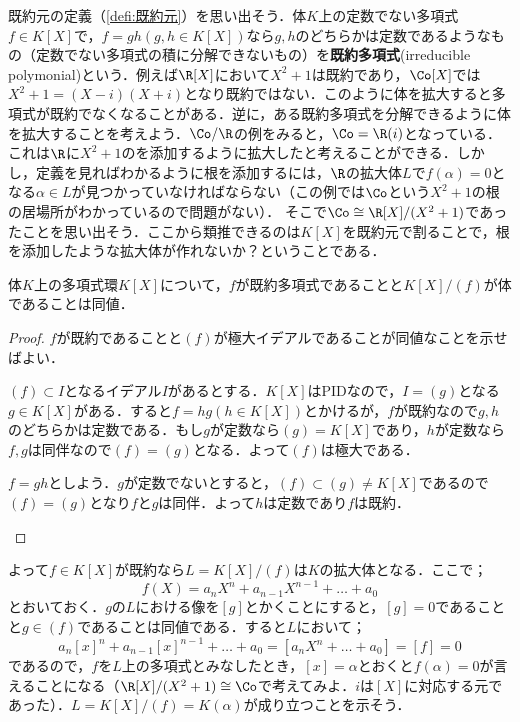 既約元の定義（\ref{defi:既約元}）を思い出そう．体$K$上の定数でない多項式$f\in K[X]$で，$f=gh (g,h\in K[X])$なら$g,h$のどちらかは定数であるようなもの（定数でない多項式の積に分解できないもの）を\textbf{既約多項式}(irreducible polymonial)という．例えば$\R[X]$において$X^2+1$は既約であり，$\Co[X]$では$X^2+1=(X-i)(X+i)$となり既約ではない．このように体を拡大すると多項式が既約でなくなることがある．逆に，ある既約多項式を分解できるように体を拡大することを考えよう．$\Co/\R$の例をみると，$\Co=\R(i)$となっている．これは$\R$に$X^2+1$のを添加するように拡大したと考えることができる．しかし，定義を見ればわかるように根を添加するには，$\R$の拡大体$L$で$f(\alpha)=0$となる$\alpha\in L$が見つかっていなければならない（この例では$\Co$という$X^2+1$の根の居場所がわかっているので問題がない）． そこで$\Co\cong\R[X]/(X^2+1)$であったことを思い出そう．ここから類推できるのは$K[X]$を既約元で割ることで，根を添加したような拡大体が作れないか？ということである．

\begin{prop}
	体$K$上の多項式環$K[X]$について，$f$が既約多項式であることと$K[X]/(f)$が体であることは同値．
\end{prop}

\begin{proof}
	$f$が既約であることと$(f)$が極大イデアルであることが同値なことを示せばよい．
	
	\begin{eqv}
		\item $(f)\subset I$となるイデアル$I$があるとする．$K[X]$はPIDなので，$I=(g)$となる$g\in K[X]$がある．すると$f=hg (h\in K[X])$とかけるが，$f$が既約なので$g,h$のどちらかは定数である．もし$g$が定数なら$(g)=K[X]$であり，$h$が定数なら$f,g$は同伴なので$(f)=(g)$となる．よって$(f)$は極大である．
		\item $f=gh$としよう．$g$が定数でないとすると，$(f)\subset(g)\neq K[X]$であるので$(f)=(g)$となり$f$と$g$は同伴．よって$h$は定数であり$f$は既約．
	\end{eqv}
\end{proof}

よって$f\in K[X]$が既約なら$L=K[X]/(f)$は$K$の拡大体となる．ここで；
\[f(X)=a_nX^n+a_{n-1}X^{n-1}+\dots+a_0\]
とおいておく．$g$の$L$における像を$[g]$とかくことにすると，$[g]=0$であることと$g\in (f)$であることは同値である．すると$L$において；
\[a_n[x]^n+a_{n-1}[x]^{n-1}+\dots+a_0=[a_nX^n+\dots+a_0]=[f]=0\]
であるので，$f$を$L$上の多項式とみなしたとき，$[x]=\alpha$とおくと$f(\alpha)=0$が言えることになる（$\R[X]/(X^2+1)\cong\Co$で考えてみよ．$i$は$[X]$に対応する元であった）．$L=K[X]/(f)=K(\alpha)$が成り立つことを示そう．

